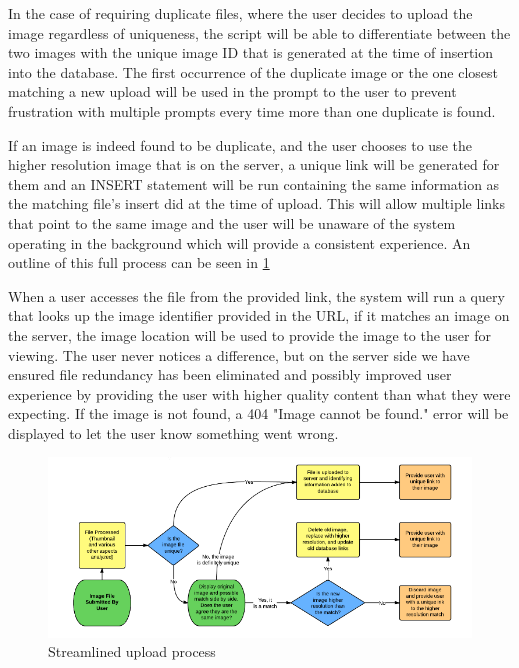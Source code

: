 \documentclass[11pt]{article}
\begin{document}
In the case of requiring duplicate files, where the user decides to upload the image regardless of uniqueness, the script will be able to differentiate between the two images with the unique image ID that is generated at the time of insertion into the database. The first occurrence of the duplicate image or the one closest matching a new upload will be used in the prompt to the user to prevent frustration with multiple prompts every time more than one duplicate is found.

If an image is indeed found to be duplicate, and the user chooses to use the higher resolution image that is on the server, a unique link will be generated for them and an INSERT statement will be run containing the same information as the matching file's insert did at the time of upload. This will allow multiple links that point to the same image and the user will be unaware of the system operating in the background which will provide a consistent experience. An outline of this full process can be seen in \ref{method-fig1}

When a user accesses the file from the provided link, the system will run a query that looks up the image identifier provided in the URL, if it matches an image on the server, the image location will be used to provide the image to the user for viewing. The user never notices a difference, but on the server side we have ensured file redundancy has been eliminated and possibly improved user experience by providing the user with higher quality content than what they were expecting. If the image is not found, a 404 "Image cannot be found." error will be displayed to let the user know something went wrong.

\begin{figure}
\begin{center}
\includegraphics[scale=.8]{upprocess}
\caption{\label{method-fig1} Streamlined upload process}
\end{center}
\end{figure}
\end{document}
